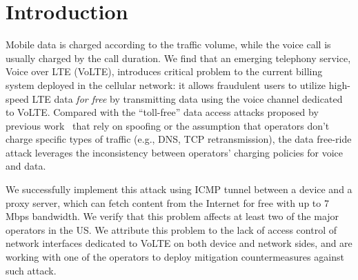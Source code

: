 

\section{Introduction}

Mobile data is charged according to the traffic volume, while the voice call is usually charged by the call duration. We find that an emerging telephony service, Voice over LTE (VoLTE), introduces critical problem to the current billing system deployed in the cellular network: it allows fraudulent users to utilize high-speed LTE data \emph{for free} by transmitting data using the voice channel dedicated to VoLTE. Compared with the ``toll-free'' data access attacks proposed by previous work~\cite{peng2012mobile,go2014gaining} that rely on spoofing or the assumption that operators don't charge specific types of traffic (e.g., DNS, TCP retransmission), the data free-ride attack leverages the inconsistency between operators' charging policies for voice and data.

We successfully implement this attack using ICMP tunnel between a device and a proxy server, which can fetch content from the Internet for free with up to 7 Mbps bandwidth. We verify that this problem affects at least two of the major operators in the US. We attribute this problem to the lack of access control of network interfaces dedicated to VoLTE on both device and network sides, and are working with one of the operators to deploy mitigation countermeasures against such attack. 